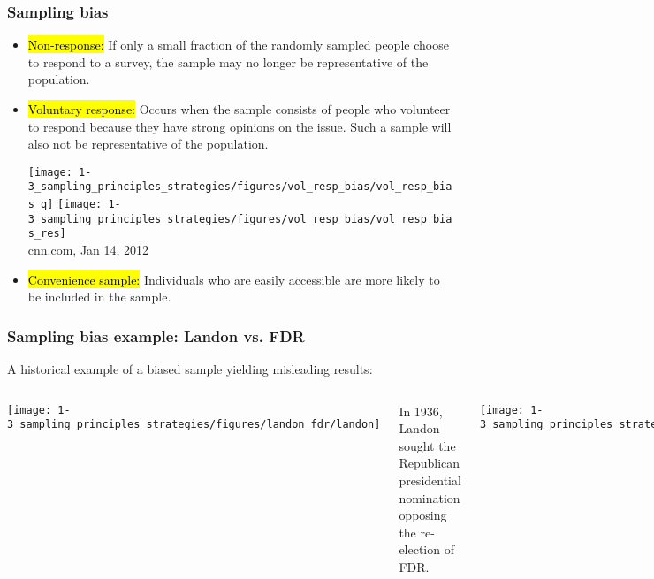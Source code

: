 \begin{frame}
\frametitle{Sampling bias}

\begin{itemize}

\item \hl{Non-response:} If only a small fraction of the randomly sampled people choose to respond to a survey, the sample may no longer be representative of the population.

\pause

\item \hl{Voluntary response:} Occurs when the sample consists of people who volunteer to respond because they have strong opinions on the issue. Such a sample will also not be representative of the population.

\pause

\begin{center}
\texttt{[image: 1-3\_sampling\_principles\_strategies/figures/vol\_resp\_bias/vol\_resp\_bias\_q]}\pause
\texttt{[image: 1-3\_sampling\_principles\_strategies/figures/vol\_resp\_bias/vol\_resp\_bias\_res]} \\
{\tiny cnn.com, Jan 14, 2012}
\end{center}

\pause

\item \hl{Convenience sample:} Individuals who are easily accessible are more likely to be included in the sample.

\end{itemize}

\end{frame}


\begin{frame}
\frametitle{Sampling bias example: Landon vs. FDR}

A historical example of a biased sample yielding misleading results: \\

$\:$ \\

\begin{columns}[c]


\texttt{[image: 1-3\_sampling\_principles\_strategies/figures/landon\_fdr/landon]}

In 1936, Landon sought the Republican presidential nomination opposing the re-election of FDR.


\texttt{[image: 1-3\_sampling\_principles\_strategies/figures/landon\_fdr/fdr]}

\end{columns}

\end{frame}

